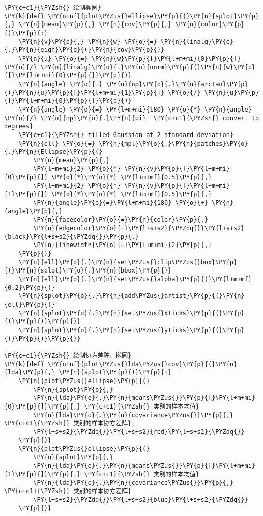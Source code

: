 \begin{Verbatim}[commandchars=\\\{\}]
\PY{c+c1}{\PYZsh{} 绘制椭圆}
\PY{k}{def} \PY{n+nf}{plot\PYZus{}ellipse}\PY{p}{(}\PY{n}{splot}\PY{p}{,} \PY{n}{mean}\PY{p}{,} \PY{n}{cov}\PY{p}{,} \PY{n}{color}\PY{p}{)}\PY{p}{:}
    \PY{n}{v}\PY{p}{,} \PY{n}{w} \PY{o}{=} \PY{n}{linalg}\PY{o}{.}\PY{n}{eigh}\PY{p}{(}\PY{n}{cov}\PY{p}{)}
    \PY{n}{u} \PY{o}{=} \PY{n}{w}\PY{p}{[}\PY{l+m+mi}{0}\PY{p}{]} \PY{o}{/} \PY{n}{linalg}\PY{o}{.}\PY{n}{norm}\PY{p}{(}\PY{n}{w}\PY{p}{[}\PY{l+m+mi}{0}\PY{p}{]}\PY{p}{)}
    \PY{n}{angle} \PY{o}{=} \PY{n}{np}\PY{o}{.}\PY{n}{arctan}\PY{p}{(}\PY{n}{u}\PY{p}{[}\PY{l+m+mi}{1}\PY{p}{]} \PY{o}{/} \PY{n}{u}\PY{p}{[}\PY{l+m+mi}{0}\PY{p}{]}\PY{p}{)}
    \PY{n}{angle} \PY{o}{=} \PY{l+m+mi}{180} \PY{o}{*} \PY{n}{angle} \PY{o}{/} \PY{n}{np}\PY{o}{.}\PY{n}{pi}  \PY{c+c1}{\PYZsh{} convert to degrees}
    \PY{c+c1}{\PYZsh{} filled Gaussian at 2 standard deviation}
    \PY{n}{ell} \PY{o}{=} \PY{n}{mpl}\PY{o}{.}\PY{n}{patches}\PY{o}{.}\PY{n}{Ellipse}\PY{p}{(}
        \PY{n}{mean}\PY{p}{,}
        \PY{l+m+mi}{2} \PY{o}{*} \PY{n}{v}\PY{p}{[}\PY{l+m+mi}{0}\PY{p}{]} \PY{o}{*}\PY{o}{*} \PY{l+m+mf}{0.5}\PY{p}{,}
        \PY{l+m+mi}{2} \PY{o}{*} \PY{n}{v}\PY{p}{[}\PY{l+m+mi}{1}\PY{p}{]} \PY{o}{*}\PY{o}{*} \PY{l+m+mf}{0.5}\PY{p}{,}
        \PY{n}{angle}\PY{o}{=}\PY{l+m+mi}{180} \PY{o}{+} \PY{n}{angle}\PY{p}{,}
        \PY{n}{facecolor}\PY{o}{=}\PY{n}{color}\PY{p}{,}
        \PY{n}{edgecolor}\PY{o}{=}\PY{l+s+s2}{\PYZdq{}}\PY{l+s+s2}{black}\PY{l+s+s2}{\PYZdq{}}\PY{p}{,}
        \PY{n}{linewidth}\PY{o}{=}\PY{l+m+mi}{2}\PY{p}{,}
    \PY{p}{)}
    \PY{n}{ell}\PY{o}{.}\PY{n}{set\PYZus{}clip\PYZus{}box}\PY{p}{(}\PY{n}{splot}\PY{o}{.}\PY{n}{bbox}\PY{p}{)}
    \PY{n}{ell}\PY{o}{.}\PY{n}{set\PYZus{}alpha}\PY{p}{(}\PY{l+m+mf}{0.2}\PY{p}{)}
    \PY{n}{splot}\PY{o}{.}\PY{n}{add\PYZus{}artist}\PY{p}{(}\PY{n}{ell}\PY{p}{)}
    \PY{n}{splot}\PY{o}{.}\PY{n}{set\PYZus{}xticks}\PY{p}{(}\PY{p}{(}\PY{p}{)}\PY{p}{)}
    \PY{n}{splot}\PY{o}{.}\PY{n}{set\PYZus{}yticks}\PY{p}{(}\PY{p}{(}\PY{p}{)}\PY{p}{)}

\PY{c+c1}{\PYZsh{} 绘制协方差阵，椭圆}
\PY{k}{def} \PY{n+nf}{plot\PYZus{}lda\PYZus{}cov}\PY{p}{(}\PY{n}{lda}\PY{p}{,} \PY{n}{splot}\PY{p}{)}\PY{p}{:}
    \PY{n}{plot\PYZus{}ellipse}\PY{p}{(}
        \PY{n}{splot}\PY{p}{,} 
        \PY{n}{lda}\PY{o}{.}\PY{n}{means\PYZus{}}\PY{p}{[}\PY{l+m+mi}{0}\PY{p}{]}\PY{p}{,} \PY{c+c1}{\PYZsh{} 类别的样本均值}
        \PY{n}{lda}\PY{o}{.}\PY{n}{covariance\PYZus{}}\PY{p}{,} \PY{c+c1}{\PYZsh{} 类别的样本协方差阵}
        \PY{l+s+s2}{\PYZdq{}}\PY{l+s+s2}{red}\PY{l+s+s2}{\PYZdq{}}
    \PY{p}{)}
    \PY{n}{plot\PYZus{}ellipse}\PY{p}{(}
        \PY{n}{splot}\PY{p}{,} 
        \PY{n}{lda}\PY{o}{.}\PY{n}{means\PYZus{}}\PY{p}{[}\PY{l+m+mi}{1}\PY{p}{]}\PY{p}{,} \PY{c+c1}{\PYZsh{} 类别的样本均值}
        \PY{n}{lda}\PY{o}{.}\PY{n}{covariance\PYZus{}}\PY{p}{,} \PY{c+c1}{\PYZsh{} 类别的样本协方差阵}
        \PY{l+s+s2}{\PYZdq{}}\PY{l+s+s2}{blue}\PY{l+s+s2}{\PYZdq{}}
    \PY{p}{)}



\end{Verbatim}
